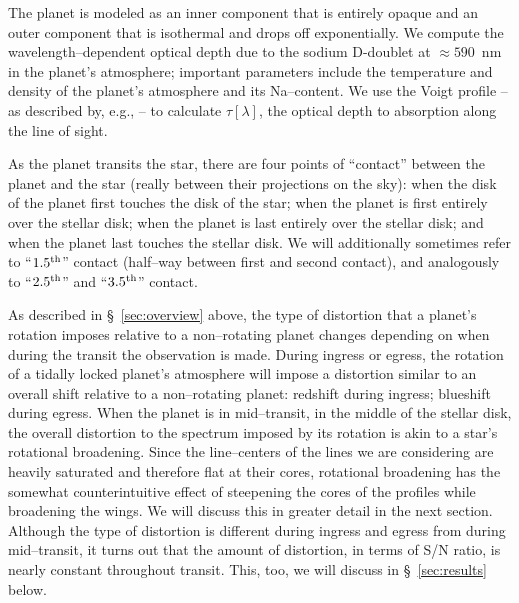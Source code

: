 \documentclass[12pt,preprint]{aastex}
\begin{document}
The planet is modeled as an inner component that is entirely opaque and an
outer component that is isothermal and drops off exponentially. We compute
the wavelength--dependent optical depth due to the sodium D-doublet at
$\approx 590$~nm in the planet's atmosphere;
important parameters include the temperature and density of the planet's
atmosphere and its Na--content.  We use the Voigt profile -- as described
by, e.g., \citet{press+rybicki1993} -- to calculate $\tau[\lambda]$, the
optical depth to absorption along the line of sight.

As the planet transits the star, there are four points of
``contact'' between the planet and the star (really between their projections
on the sky): when the disk of the planet first touches the disk of the
star; when the planet is first entirely over the stellar disk; when the planet
is last entirely over the stellar disk; and when the planet last
touches the stellar disk.  We will additionally sometimes refer to
``$1.5^{\rm th}$'' contact (half--way between first and second contact),
and analogously to ``$2.5^{\rm th}$'' and ``$3.5^{\rm th}$'' contact.

As described in \S~\ref{sec:overview} above, the type of distortion that a
planet's rotation imposes relative to a non--rotating planet changes
depending on when during the transit the observation is made.  During
ingress or egress, the rotation of a tidally locked planet's atmosphere will
impose a distortion similar to an overall shift relative to a non--rotating planet: redshift during ingress; blueshift during egress.
When the planet is in mid--transit, in the middle of the stellar disk,
the overall distortion to the spectrum imposed by its rotation is
akin to a star's rotational broadening.  Since the line--centers of the lines
we are considering are heavily saturated and therefore flat at their
cores, rotational broadening has the somewhat counterintuitive effect
of steepening the cores of the profiles while broadening the wings.
We will discuss this in greater detail in the next section.
Although the type of distortion is different during ingress and egress from
during mid--transit, it turns out that the amount of distortion, in terms of
S/N ratio, is nearly constant throughout transit.  This, too, we will discuss
in \S~\ref{sec:results} below.
\end{document}
